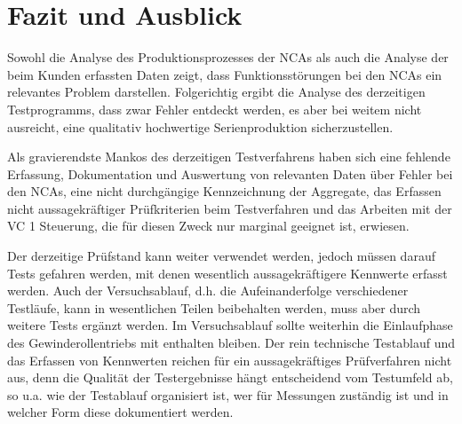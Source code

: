\chapter{Fazit und Ausblick}



Sowohl die Analyse des Produktionsprozesses der NCAs als auch  die Analyse der beim Kunden erfassten Daten zeigt, dass Funktionsstörungen bei den NCAs ein relevantes Problem darstellen. Folgerichtig ergibt die Analyse des derzeitigen Testprogramms, dass zwar Fehler entdeckt werden, es aber bei weitem nicht ausreicht, eine qualitativ hochwertige Serienproduktion sicherzustellen.


Als gravierendste Mankos des derzeitigen Testverfahrens haben sich eine fehlende Erfassung, Dokumentation und Auswertung von relevanten Daten über Fehler bei den NCAs, eine nicht durchgängige Kennzeichnung der Aggregate, das Erfassen nicht aussagekräftiger Prüfkriterien beim Testverfahren und das Arbeiten mit der VC 1 Steuerung, die für diesen Zweck nur marginal geeignet ist, erwiesen.

Der derzeitige Prüfstand kann weiter verwendet werden, jedoch müssen darauf Tests gefahren werden, mit denen wesentlich aussagekräftigere Kennwerte erfasst werden.  Auch der Versuchsablauf, d.h. die Aufeinanderfolge verschiedener Testläufe, kann in wesentlichen Teilen beibehalten werden, muss aber durch weitere Tests ergänzt werden. Im Versuchsablauf  sollte weiterhin die Einlaufphase des Gewinderollentriebs mit enthalten bleiben. Der rein technische Testablauf und das Erfassen von Kennwerten reichen für ein aussagekräftiges Prüfverfahren nicht aus, denn die Qualität der Testergebnisse hängt entscheidend vom Testumfeld ab, so u.a. wie der Test\-ab\-lauf organisiert ist, wer für Messungen zuständig ist und in welcher Form diese dokumentiert werden.








